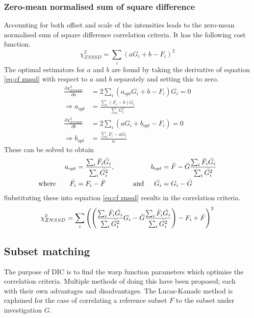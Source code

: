 \subsubsection{Zero-mean normalised sum of square difference}
Accounting for both offset and scale of the intensities leads to the zero-mean normalised sum of square difference correlation criteria. It has the following cost function.
\begin{equation}
\label{eq:cf znssd}
	\chi_{ZNSSD}^2 = \sum_i \left( a G_i + b - F_i \right) ^2
\end{equation}
The optimal estimators for $a$ and $b$ are found by taking the derivative of equation \ref{eq:cf znssd} with respect to $a$ and $b$ separately and setting this to zero.
\begin{align}
	\frac{\partial \chi_{ZNSSD}^2 }{\partial a} &= 2 \sum_i \left( a_{opt} G_i + b- F_i \right) G_i = 0\\
	\Rightarrow a_{opt} &= \frac{\sum_i \left( F_i - b \right) G_i}{\sum_i G_i^2} \\
	\frac{\partial \chi_{ZNSSD}^2 }{\partial b} &= 2 \sum_i \left( a G_i + b_{opt} - F_i \right) = 0\\
	\Rightarrow b_{opt} &= \frac{\sum_i F_i -a G_i}{n}
\end{align}
These can be solved to obtain
\begin{align}
	a_{opt} &= \frac{\sum_i \bar{F_i} \bar{G_i}}{\sum_i \bar{G_i^2}}, &b_{opt}&= \bar{F} -\bar{G} \frac{\sum_i \bar{F_i} \bar{G_i}}{\sum_i \bar{G_i^2}} \\
	\text{where} \quad \quad \bar{F_i} &= F_i - \bar{F} \quad \quad \quad \quad \text{and} & \bar{G_i} &= G_i -\bar{G}
\end{align}
Substituting these into equation \ref{eq:cf znssd} results in the correlation criteria.
\begin{equation}
	\chi_{ZNSSD}^2 = \sum_i \left( \left( \frac{\sum_i \bar{F_i} \bar{G_i}}{\sum_i \bar{G_i^2}} G_i - \bar{G} \frac{\sum_i \bar{F_i} \bar{G_i}}{\sum_i \bar{G_i^2}} \right) - F_i + \bar{F} \right) ^2
\end{equation}

\subsection{Subset matching}
The purpose of DIC is to find the warp function parameters which optimise the correlation criteria. Multiple methods of doing this have been proposed; each with their own advantages and disadvantages. The Lucas-Kanade method is explained for the case of correlating a reference subset $F$ to the subset under investigation $G$.

